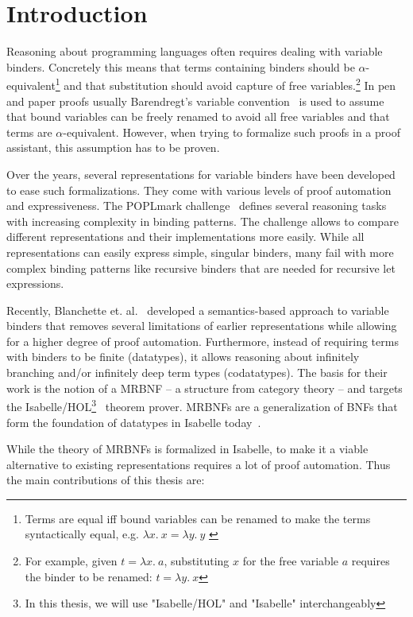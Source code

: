 \chapter{Introduction}\label{chapter:introduction}

Reasoning about programming languages often requires dealing with variable binders. Concretely this means that terms containing binders should be $\alpha$-equivalent\footnote{Terms are equal iff bound variables can be renamed to make the terms syntactically equal, e.g. $\lambda x. \: x = \lambda y. \: y$ \label{ftn:alpha-equivalence}} and that substitution should avoid capture of free variables.\footnote{For example, given $t = \lambda x. \: a$, substituting $x$ for the free variable $a$ requires the binder to be renamed: $t = \lambda y.\: x$} In pen and paper proofs usually Barendregt's variable convention~\cite{variable_convention} is used to assume that bound variables can be freely renamed to avoid all free variables and that terms are $\alpha$-equivalent. However, when trying to formalize such proofs in a proof assistant, this assumption has to be proven.

Over the years, several representations for variable binders have been developed to ease such formalizations. They come with various levels of proof automation and expressiveness. The POPLmark challenge~\cite{poplmark} defines several reasoning tasks with increasing complexity in binding patterns. The challenge allows to compare different representations and their implementations more easily. While all representations can easily express simple, singular binders, many fail with more complex binding patterns like recursive binders that are needed for recursive let expressions.

Recently, Blanchette et. al.~\cite{mrbnfs} developed a semantics-based approach to variable binders that removes several limitations of earlier representations while allowing for a higher degree of proof automation. Furthermore, instead of requiring terms with binders to be finite (datatypes), it allows reasoning about infinitely branching and/or infinitely deep term types (codatatypes). The basis for their work is the notion of a \acf{MRBNF} -- a structure from category theory -- and targets the Isabelle/HOL\footnote{In this thesis, we will use "Isabelle/HOL" and "Isabelle" interchangeably}~\cite{isabelle} theorem prover. \acp{MRBNF} are a generalization of \acp{BNF} that form the foundation of datatypes in Isabelle today~\cite{isabelle_datatypes}.

While the theory of \acp{MRBNF} is formalized in Isabelle, to make it a viable alternative to existing representations requires a lot of proof automation. Thus the main contributions of this thesis are:

